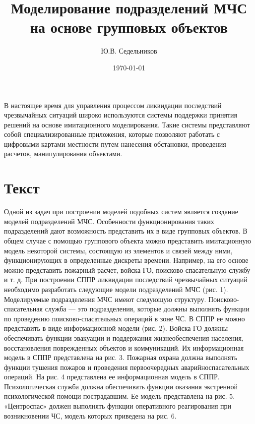 \documentclass[12pt]{article}
\begin{document}
\title{Моделирование подразделений МЧС на основе
групповых объектов}

\author{Ю.В. Седельников}
\date{\today}
\maketitle

\abstract
В настоящее время для управления процессом ликвидации последствий чрезвычайных
ситуаций широко используются системы поддержки принятия решений на основе
имитационного моделирования. Такие системы представляют собой специализированные
приложения, которые позволяют работать с цифровыми картами местности путем нанесения
обстановки, проведения расчетов, манипулирования объектами.

\section{Текст}

Одной из задач при построении моделей подобных
систем является создание моделей подразделений
МЧС. Особенности функционирования таких подразделений дают возможность представить их в виде групповых объектов.
В общем случае с помощью группового объекта
можно представить имитационную модель некоторой
системы, состоящую из элементов и связей между ними, функционирующих в определенные дискреты времени. Например, на его основе можно представить пожарный расчет, войска ГО, поисково-спасательную
службу и т. д.
При построении СППР ликвидации последствий
чрезвычайных ситуаций необходимо разработать следующие модели подразделений МЧС (рис. 1).
Моделируемые подразделения МЧС имеют следующую структуру.
Поисково-спасательная служба — это подразделения, которые должны выполнять функции по проведению поисково-спасательных операций в зоне ЧС.
В СППР ее можно представить в виде информационной модели (рис. 2).
Войска ГО должны обеспечивать функции эвакуации и поддержания жизнеобеспечения населения, восстановления поврежденных объектов и коммуникаций.
Их информационная модель в СППР представлена
на рис. 3.
Пожарная охрана должна выполнять функции тушения пожаров и проведения первоочередных аварийноспасательных операций. На рис. 4 представлена ее информационная модель в СППР.
Психологическая служба должна обеспечивать
функции оказания экстренной психологической помощи пострадавшим. Ее модель представлена
на рис. 5.
«Центроспас» должен выполнять функции оперативного реагирования при возникновении ЧС, модель которых приведена на рис. 6.

\end{document}
